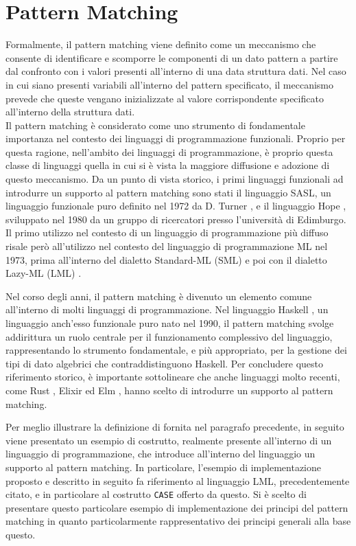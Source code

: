 \section{Pattern Matching}

Formalmente, il pattern matching viene definito come un meccanismo che consente
di identificare e scomporre le componenti di un dato pattern a partire dal
confronto con i valori presenti all’interno di una data struttura dati. Nel
caso in cui siano presenti variabili all’interno del pattern specificato, il
meccanismo prevede che queste vengano inizializzate al valore corrispondente
specificato all’interno della struttura dati.\\

Il pattern matching è considerato come uno strumento di fondamentale importanza
nel contesto dei linguaggi di programmazione funzionali. Proprio per questa
ragione, nell’ambito dei linguaggi di programmazione, è proprio questa classe
di linguaggi quella in cui si è vista la maggiore diffusione e adozione di
questo meccanismo. Da un punto di vista storico, i primi linguaggi funzionali
ad introdurre un supporto al pattern matching sono stati il linguaggio SASL, un
linguaggio funzionale puro definito nel 1972 da D. Turner
\cite{DBLP:journals/spe/Turner79}, e il linguaggio Hope
\cite{DBLP:conf/lfp/BurstallMS80}, sviluppato nel 1980 da un gruppo di
ricercatori presso l'università di Edimburgo. Il primo utilizzo nel contesto di
un linguaggio di programmazione più diffuso risale però all’utilizzo nel
contesto del linguaggio di programmazione ML nel 1973, prima all’interno del
dialetto Standard-ML (SML) \cite{milner1997definition} e poi con il dialetto
Lazy-ML (LML) \cite{DBLP:conf/lfp/Augustsson84}.

Nel corso degli anni, il pattern matching è divenuto un elemento comune
all'interno di molti linguaggi di programmazione. Nel linguaggio Haskell
\cite{DBLP:conf/hopl/HudakHJW07}, un linguaggio anch'esso funzionale puro nato
nel 1990, il pattern matching svolge addirittura un ruolo centrale per il
funzionamento complessivo del linguaggio, rappresentando lo strumento
fondamentale, e più appropriato, per la gestione dei tipi di dato algebrici che
contraddistinguono Haskell. Per concludere questo riferimento storico, è
importante sottolineare che anche linguaggi molto recenti, come Rust
\cite{rust2016}, Elixir \cite{laurent2014introducing} ed Elm \cite{elm2016}, 
hanno scelto di introdurre un supporto al pattern matching.

Per meglio illustrare la definizione di fornita nel paragrafo precedente, in
seguito viene presentato un esempio di costrutto, realmente presente
all'interno di un linguaggio di programmazione, che introduce all'interno del
linguaggio un supporto al pattern matching. In particolare, l'esempio di
implementazione proposto e descritto in seguito fa riferimento al linguaggio
LML, precedentemente citato, e in particolare al costrutto \texttt{CASE}
offerto da questo. Si è scelto di presentare questo particolare esempio di
implementazione dei principi del pattern matching in quanto particolarmente
rappresentativo dei principi generali alla base questo.

